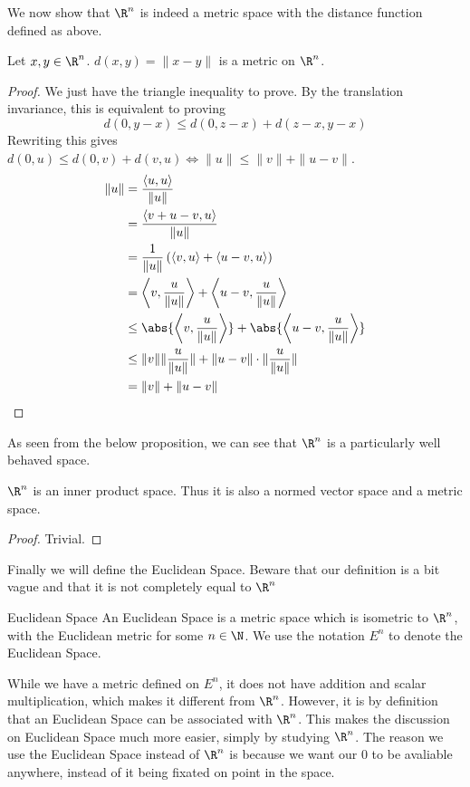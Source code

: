 We now show that $\R^n$ is indeed a metric space with the distance function defined as above. 

\begin{thm}{}{} Let $x,y\in\R^n$. $d(x,y)=\|x-y\|$ is a metric on $\R^n$. \tcbline
\begin{proof} We just have the triangle inequality to prove. By the translation invariance, this is equivalent to proving $$d(0,y-x)\leq d(0,z-x)+d(z-x,y-x)$$ Rewriting this gives $d(0,u)\leq d(0,v)+d(v,u)\iff\|u\|\leq\|v\|+\|u-v\|$. 
\begin{align*}
\|u\|&=\frac{\langle u,u\rangle}{\|u\|}\\
&=\frac{\langle v+u-v,u\rangle}{\|u\|}\\
&=\frac{1}{\|u\|}\left(\langle v,u\rangle+\langle u-v,u\rangle\right)\\
&=\left\langle v,\frac{u}{\|u\|}\right\rangle+\left\langle u-v,\frac{u}{\|u\|}\right\rangle\\
&\leq\abs{\left\langle v,\frac{u}{\|u\|}\right\rangle}+\abs{\left\langle u-v,\frac{u}{\|u\|}\right\rangle}\\
&\leq\|v\|\|\frac{u}{\|u\|}\|+\|u-v\|\cdot\|\frac{u}{\|u\|}\|\\
&=\|v\|+\|u-v\|
\end{align*}
\end{proof}
\end{thm}

As seen from the below proposition, we can see that $\R^n$ is a particularly well behaved space. 

\begin{prp}{}{} $\R^n$ is an inner product space. Thus it is also a normed vector space and a metric space. \tcbline
\begin{proof} Trivial. 
\end{proof}
\end{prp}

Finally we will define the Euclidean Space. Beware that our definition is a bit vague and that it is not completely equal to $\R^n$

\begin{defn}{Euclidean Space}{} An Euclidean Space is a metric space which is isometric to $\R^n$, with the Euclidean metric for some $n\in\N$. We use the notation $E^n$ to denote the Euclidean Space. 
\end{defn}

While we have a metric defined on $E^n$, it does not have addition and scalar multiplication, which makes it different from $\R^n$. However, it is by definition that an Euclidean Space can be associated with $\R^n$. This makes the discussion on Euclidean Space much more easier, simply by studying $\R^n$. \linebreak\linebreak
The reason we use the Euclidean Space instead of $\R^n$ is because we want our $0$ to be avaliable anywhere, instead of it being fixated on point in the space. 

